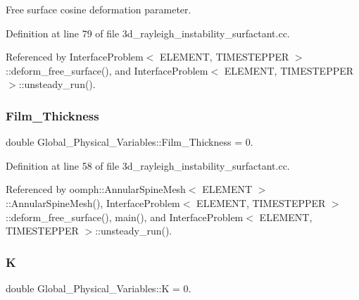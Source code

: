 Free surface cosine deformation parameter. 



Definition at line 79 of file 3d\+\_\+rayleigh\+\_\+instability\+\_\+surfactant.\+cc.



Referenced by Interface\+Problem$<$ E\+L\+E\+M\+E\+N\+T, T\+I\+M\+E\+S\+T\+E\+P\+P\+E\+R $>$\+::deform\+\_\+free\+\_\+surface(), and Interface\+Problem$<$ E\+L\+E\+M\+E\+N\+T, T\+I\+M\+E\+S\+T\+E\+P\+P\+E\+R $>$\+::unsteady\+\_\+run().

\mbox{\label{namespaceGlobal__Physical__Variables_a4d1da0a125f6044733e121f0f3d958ca}} 
\subsubsection{\texorpdfstring{Film\+\_\+\+Thickness}{Film\_Thickness}}
{\footnotesize\ttfamily double Global\+\_\+\+Physical\+\_\+\+Variables\+::\+Film\+\_\+\+Thickness = 0.}



Definition at line 58 of file 3d\+\_\+rayleigh\+\_\+instability\+\_\+surfactant.\+cc.



Referenced by oomph\+::\+Annular\+Spine\+Mesh$<$ E\+L\+E\+M\+E\+N\+T $>$\+::\+Annular\+Spine\+Mesh(), Interface\+Problem$<$ E\+L\+E\+M\+E\+N\+T, T\+I\+M\+E\+S\+T\+E\+P\+P\+E\+R $>$\+::deform\+\_\+free\+\_\+surface(), main(), and Interface\+Problem$<$ E\+L\+E\+M\+E\+N\+T, T\+I\+M\+E\+S\+T\+E\+P\+P\+E\+R $>$\+::unsteady\+\_\+run().

\mbox{\label{namespaceGlobal__Physical__Variables_a9da8be10d9e20eb0329af7fd8d6e0e98}} 
\subsubsection{\texorpdfstring{K}{K}}
{\footnotesize\ttfamily double Global\+\_\+\+Physical\+\_\+\+Variables\+::K = 0.}



